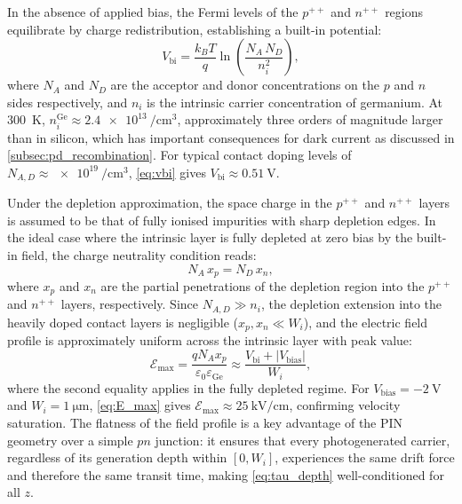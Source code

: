 In the absence of applied bias, the Fermi levels of the $p^{++}$ and $n^{++}$
regions equilibrate by charge redistribution, establishing a built-in potential:
\begin{equation}
    V_{\mathrm{bi}}
    = \frac{k_B T}{q}\ln\!\left(\frac{N_A\,N_D}{n_i^2}\right),
    \label{eq:vbi}
\end{equation}
where $N_A$ and $N_D$ are the acceptor and donor concentrations on the $p$ and
$n$ sides respectively, and $n_i$ is the intrinsic carrier concentration of
germanium. At \SI{300}{\kelvin}, $n_i^{\mathrm{Ge}} \approx
\SI{2.4e13}{\per\centi\metre\cubed}$, approximately three orders of magnitude
larger than in silicon, which has important consequences for dark current as
discussed in \cref{subsec:pd_recombination}. For typical contact doping levels
of $N_{A,D} \approx \SI{e19}{\per\centi\metre\cubed}$, \cref{eq:vbi} gives
$V_{\mathrm{bi}} \approx \SI{0.51}{\volt}$.

Under the depletion approximation, the space charge in the $p^{++}$ and
$n^{++}$ layers is assumed to be that of fully ionised impurities with sharp
depletion edges. In the ideal case where the intrinsic layer is fully depleted
at zero bias by the built-in field, the charge neutrality condition reads:
\begin{equation}
    N_A\,x_p = N_D\,x_n,
    \label{eq:charge_neutral}
\end{equation}
where $x_p$ and $x_n$ are the partial penetrations of the depletion region
into the $p^{++}$ and $n^{++}$ layers, respectively. Since
$N_{A,D} \gg n_i$, the depletion extension into the heavily doped contact
layers is negligible ($x_p, x_n \ll W_i$), and the electric field profile
is approximately uniform across the intrinsic layer with peak value:
\begin{equation}
    \mathcal{E}_{\max}
    = \frac{q N_A x_p}{\varepsilon_0 \varepsilon_{\mathrm{Ge}}}
    \approx \frac{V_{\mathrm{bi}} + |V_{\mathrm{bias}}|}{W_i},
    \label{eq:E_max}
\end{equation}
where the second equality applies in the fully depleted regime. For
$V_{\mathrm{bias}} = \SI{-2}{\volt}$ and $W_i = \SI{1}{\micro\metre}$,
\cref{eq:E_max} gives $\mathcal{E}_{\max} \approx \SI{25}{\kilo\volt\per\centi\metre}$,
confirming velocity saturation. The flatness of the field profile is a key
advantage of the PIN geometry over a simple $pn$ junction: it ensures that
every photogenerated carrier, regardless of its generation depth within $[0,W_i]$,
experiences the same drift force and therefore the same transit time, making
\cref{eq:tau_depth} well-conditioned for all $z$.

